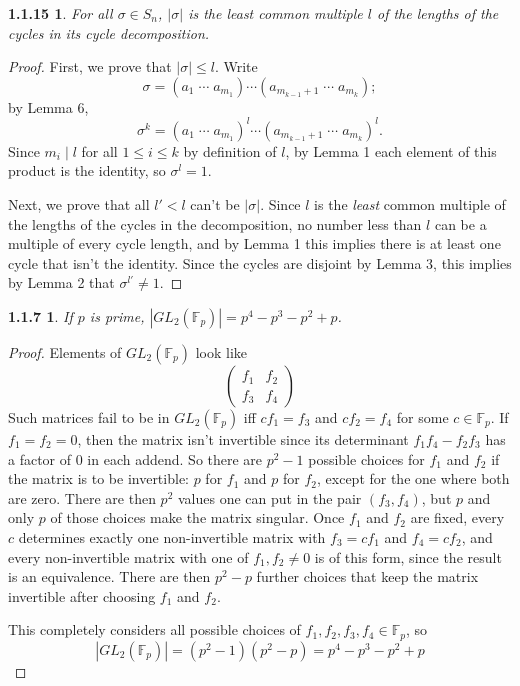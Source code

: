 \documentclass{article}
\newtheorem*{1.3.15}{1.1.15}
\newtheorem*{1.4.7}{1.1.7}
\begin{document}
\begin{1.3.15}
  For all $\sigma\in S_{n}$, $|\sigma|$ is the least common multiple $l$ of the lengths of the cycles in its cycle decomposition.
\end{1.3.15}
\begin{proof}
  First, we prove that $|\sigma| \leq l$.
  Write
  \[
    \sigma = (a_{1}\;\cdots\;a_{m_{1}} )\cdots(a_{m_{k-1}+1}\;\cdots\;a_{m_{k}});
  \]
  by Lemma 6,
  \[
    \sigma^{k} = (a_{1}\;\cdots\;a_{m_{1}} )^{l}\cdots(a_{m_{k-1}+1}\;\cdots\;a_{m_{k}})^{l}.
  \]
  Since $m_{i}\mid l$ for all $1\leq i\leq k$ by definition of $l$, by Lemma 1 each element of this product is the identity, so $\sigma^{l}=1$.

  Next, we prove that all $l' < l$ can't be $|\sigma|$.
  Since $l$ is the \textit{least} common multiple of the lengths of the cycles in the decomposition,
  no number less than $l$ can be a multiple of every cycle length, and by Lemma 1 this implies there is at least one cycle that isn't the identity.
  Since the cycles are disjoint by Lemma 3, this implies by Lemma 2 that $\sigma^{l'}\neq 1$.
\end{proof}

\begin{1.4.7}
  If $p$ is prime, $|GL_{2}(\mathbb{F}_{p})|=p^{4}-p^{3}-p^{2}+p$.
\end{1.4.7}
\begin{proof}
    Elements of $GL_{2}(\mathbb{F}_{p})$ look like
  \[
    \begin{pmatrix}
      f_{1} & f_{2} \\
      f_{3} & f_{4}
    \end{pmatrix}
  \]
  Such matrices fail to be in $GL_{2}(\mathbb{F}_{p})$ iff $cf_{1} = f_{3}$ and $cf_{2} = f_{4}$ for some $c\in\mathbb{F}_{p}$.
  If $f_{1}=f_{2}=0$, then the matrix isn't invertible since its determinant $f_{1}f_{4}-f_{2}f_{3}$ has a factor of 0 in each addend.
  So there are $p^{2}-1$ possible choices for $f_{1}$ and $f_{2}$ if the matrix is to be invertible: $p$ for $f_{1}$ and $p$ for $f_{2}$,
  except for the one where both are zero.
  There are then $p^{2}$ values one can put in the pair $(f_{3},f_{4})$, but $p$ and only $p$ of those choices make the matrix singular.
  Once $f_{1}$ and $f_{2}$ are fixed, every $c$ determines exactly one non-invertible matrix with $f_{3}=cf_{1}$ and $f_{4}=cf_{2}$,
  and every non-invertible matrix with one of $f_{1},f_{2}\neq 0$ is of this form, since the result is an equivalence.
   There are then $p^{2}-p$ further choices that keep the matrix invertible after choosing $f_{1}$ and $f_{2}$.

  This completely considers all possible choices of $f_{1},f_{2},f_{3},f_{4}\in\mathbb{F}_{p}$, so
  \[
    |GL_{2}(\mathbb{F}_{p})|=(p^{2}-1)(p^{2}-p) = p^{4}-p^{3}-p^{2}+p
  \]
\end{proof}
\end{document}
